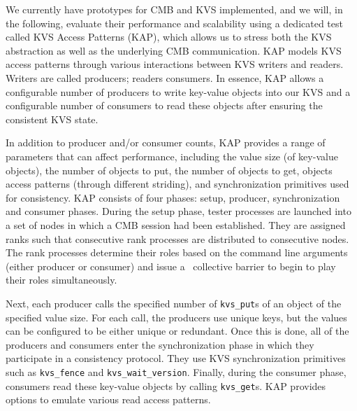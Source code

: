 We currently have prototypes for CMB and KVS implemented, and we
will, in the following, evaluate their performance and scalability
using
a dedicated test called KVS Access Patterns (KAP), which allows us to stress both the KVS abstraction as well as the underlying CMB communication.
KAP models KVS access patterns through various interactions
between KVS writers and readers. Writers are called producers;
readers consumers.
In essence, KAP allows a configurable number of producers
to write key-value objects into our KVS 
and a configurable number of consumers to read these
objects after ensuring the consistent KVS state.

In addition to producer and/or consumer counts,
KAP provides a range of parameters that can affect performance, including
the value size (of key-value objects),
the number of objects to put,
the number of objects to get, objects access 
patterns (through different striding), and
synchronization primitives used for consistency.
KAP consists of four phases: setup, producer, synchronization 
and consumer phases. 
During the setup phase, tester processes are launched 
into a set of nodes in which a CMB session had been established.
They are assigned ranks such that consecutive rank
processes are distributed to consecutive nodes.
The rank processes determine their roles based
on the command line arguments (either producer or consumer) and issue a
\flux\ collective barrier to begin to play their roles
simultaneously.

Next, each producer calls the specified number of
{\tt kvs\_put}s of an object of the specified value size.
For each call, the producers use unique keys, but
the values can be configured to be either unique
or redundant.
Once this is done, all of the producers and consumers
enter the synchronization phase in which they 
participate in a consistency protocol. They use
KVS synchronization primitives such as {\tt kvs\_fence}
and {\tt kvs\_wait\_version}.
Finally, during the consumer phase, consumers read
these key-value objects by calling {\tt kvs\_get}s.
KAP provides options to emulate various read access
patterns.

